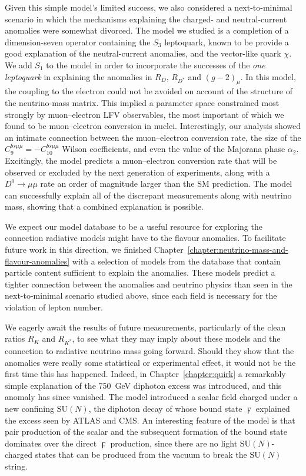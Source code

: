 Given this simple model's limited success, we also considered a next-to-minimal
scenario in which the mechanisms explaining the charged- and neutral-current
anomalies were somewhat divorced. The model we studied is a completion of a
dimension-seven operator containing the $S_{3}$ leptoquark, known to be provide
a good explanation of the neutral-current anomalies, and the vector-like quark
$\chi$. We add $S_{1}$ to the model in order to incorporate the successes of the
\textit{one leptoquark} in explaining the anomalies in $R_{D}$, $R_{D^{*}}$ and
$(g-2)_{\mu}$. In this model, the coupling to the electron could not be avoided
on account of the structure of the neutrino-mass matrix. This implied a
parameter space constrained most strongly by muon--electron LFV observables, the
most important of which we found to be muon--electron conversion in nuclei.
Interestingly, our analysis showed an intimate connection between the
muon--electron conversion rate, the size of the
$C_{9}^{bs\mu\mu} = - C_{10}^{bs\mu\mu}$ Wilson coefficients, and even the value
of the Majorana phase $\alpha_{2}$. Excitingly, the model predicts a
muon--electron conversion rate that will be observed or excluded by the next
generation of experiments, along with a $D^{0} \to \mu\mu$ rate an order of
magnitude larger than the SM prediction. The model can successfully explain all
of the discrepant measurements along with neutrino mass, showing that a combined
explanation is possible.

We expect our model database to be a useful resource for exploring the
connection radiative models might have to the flavour anomalies. To facilitate
future work in this direction, we finished
Chapter~\ref{chapter:neutrino-mass-and-flavour-anomalies} with a selection of
models from the database that contain particle content sufficient to explain the
anomalies. These models predict a tighter connection between the anomalies and
neutrino physics than seen in the next-to-minimal scenario studied above, since
each field is necessary for the violation of lepton number.

We eagerly await the results of future measurements, particularly of the clean
ratios $R_{K}$ and $R_{K^{*}}$, to see what they may imply about these models
and the connection to radiative neutrino mass going forward. Should they show
that the anomalies were really some statistical or experimental effect, it would
not be the first time this has happened. Indeed, in Chapter~\ref{chapter:quirk}
a remarkably simple explanation of the \SI{750}{\GeV} diphoton excess was
introduced, and this anomaly has since vanished. The model introduced a scalar
field charged under a new confining $\mathrm{SU}(N)$, the diphoton decay of
whose bound state $\digamma$ explained the excess seen by ATLAS and CMS. An
interesting feature of the model is that pair production of the scalar and the
subsequent formation of the bound state dominates over the direct $\digamma$
production, since there are no light $\mathrm{SU}(N)$-charged states that can be
produced from the vacuum to break the $\mathrm{SU}(N)$ string.


